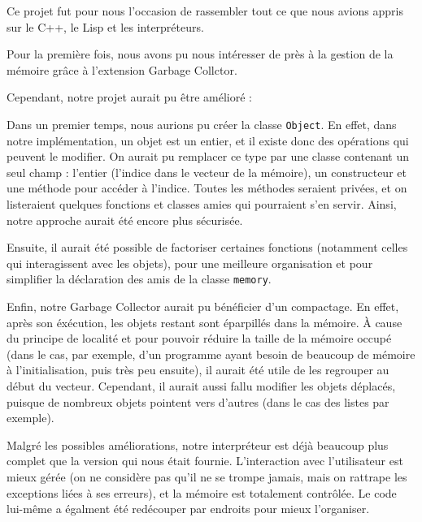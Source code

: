 \documentclass[12pt]{article}
\def\code #1{\lstinline{#1}}
\begin{document}
Ce projet fut pour nous l'occasion de rassembler tout ce que nous avions appris sur le C++, le Lisp et les interpréteurs.

Pour la première fois, nous avons pu nous intéresser de près à la gestion de la mémoire grâce à l'extension Garbage Collctor.


Cependant, notre projet aurait pu être amélioré :

Dans un premier temps, nous aurions pu créer la classe \code{Object}.
En effet, dans notre implémentation, un objet est un entier, et il existe donc des opérations qui peuvent le modifier. On aurait pu remplacer ce type par une classe contenant un seul champ : l'entier (l'indice dans le vecteur de la mémoire), un constructeur et une méthode pour accéder à l'indice. Toutes les méthodes seraient privées, et on listeraient quelques fonctions et classes amies qui pourraient s'en servir. Ainsi, notre approche aurait été encore plus sécurisée.

Ensuite, il aurait été possible de factoriser certaines fonctions (notamment celles qui interagissent avec les objets), pour une meilleure organisation et pour simplifier la déclaration des amis de la classe \code{memory}.

Enfin, notre Garbage Collector aurait pu bénéficier d'un compactage. En effet, après son éxécution, les objets restant sont éparpillés dans la mémoire. À cause du principe de localité et pour pouvoir réduire la taille de la mémoire occupé (dans le cas, par exemple, d'un programme ayant besoin de beaucoup de mémoire à l'initialisation, puis très peu ensuite), il aurait été utile de les regrouper au début du vecteur. Cependant, il aurait aussi fallu modifier les objets déplacés, puisque de nombreux objets pointent vers d'autres (dans le cas des listes par exemple).

Malgré les possibles améliorations, notre interpréteur est déjà beaucoup plus complet que la version qui nous était fournie. L'interaction avec l'utilisateur est mieux gérée (on ne considère pas qu'il ne se trompe jamais, mais on rattrape les exceptions liées à ses erreurs), et la mémoire est totalement contrôlée. Le code lui-même a égalment été redécouper par endroits pour mieux l'organiser.
\end{document}
